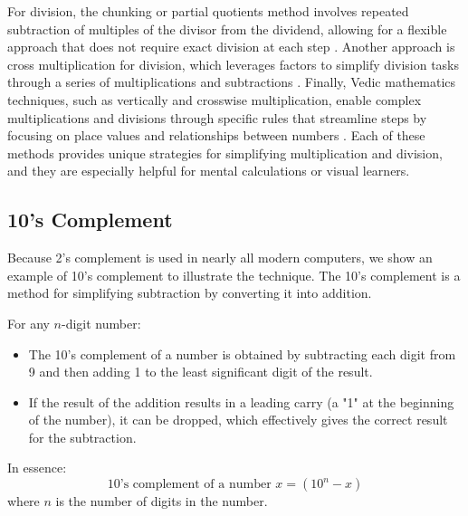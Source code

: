 For division, the chunking or partial quotients method involves repeated subtraction of multiples of the divisor from the dividend, allowing for a flexible approach that does not require exact division at each step \cite{reys1995}. Another approach is cross multiplication for division, which leverages factors to simplify division tasks through a series of multiplications and subtractions \cite{parker2014}. Finally, Vedic mathematics techniques, such as vertically and crosswise multiplication, enable complex multiplications and divisions through specific rules that streamline steps by focusing on place values and relationships between numbers \cite{tirthaji1992}. Each of these methods provides unique strategies for simplifying multiplication and division, and they are especially helpful for mental calculations or visual learners.

\subsection{10's Complement} \label{sub:10s_complement}
Because 2's complement is used in nearly all modern computers, we show an example of 10's complement to illustrate the technique.
The 10’s complement is a method for simplifying subtraction by converting it into addition. 

\vspace{\baselineskip}\par
For any \( n \)-digit number:
 \begin{itemize}
    \item The 10's complement of a number is obtained by subtracting each digit from 9 and then adding 1 to the least significant digit of the result.
    \item If the result of the addition results in a leading carry (a "1" at the beginning of the number), it can be dropped, which effectively gives the correct result for the subtraction.
  \end{itemize}

\vspace{\baselineskip}\par
In essence:
\[
\text{10's complement of a number } x = (10^n - x)
\]
where \( n \) is the number of digits in the number.

